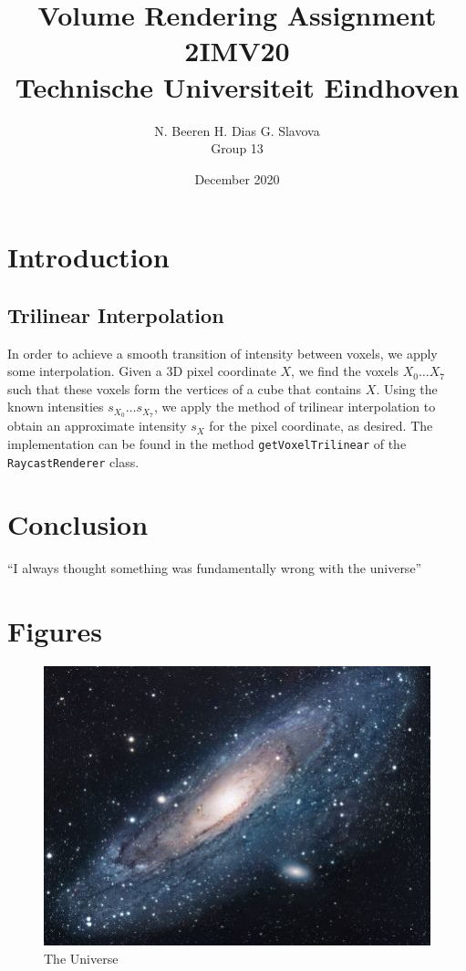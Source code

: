\documentclass[a4paper]{article}
\title{Volume Rendering Assignment\\2IMV20\\Technische Universiteit Eindhoven}
\author{N. Beeren \quad H. Dias \quad G. Slavova\\Group 13}
\date{December 2020}
\begin{document}
\maketitle

\section{Introduction}

\subsection{Trilinear Interpolation}

In order to achieve a smooth transition of intensity between voxels, we apply some interpolation. Given a 3D pixel coordinate $X$, we find the voxels $X_0 \ldots X_7$ such that these voxels form the vertices of a cube that contains $X$. Using the known intensities $s_{X_0}\ldots s_{X_7}$, we apply the method of trilinear interpolation to obtain an approximate intensity $s_X$ for the pixel coordinate, as desired. The implementation can be found in the method {\tt getVoxelTrilinear} of the {\tt RaycastRenderer} class.

\section{Conclusion}
``I always thought something was fundamentally wrong with the universe'' \citep{adams1995hitchhiker}




\appendix
\section{Figures}

\begin{figure}[h!]
\centering
\includegraphics[scale=1.7]{universe}
\caption{The Universe}
\label{fig:universe}
\end{figure}
\end{document}
